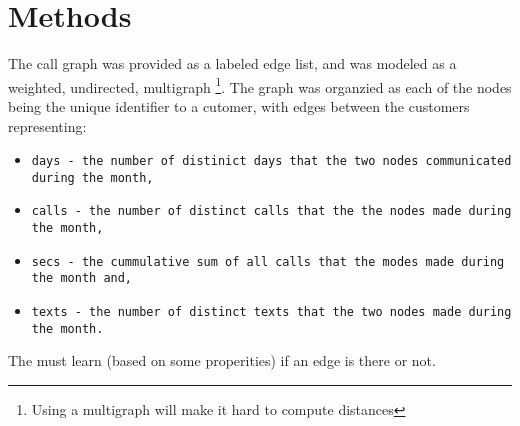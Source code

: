 \section{Methods}
The call graph was provided as a labeled edge list, and was modeled as a weighted, undirected, multigraph \footnote{Using a multigraph will make it hard to compute distances}.
The graph was organzied as each of the nodes being the unique identifier to a cutomer, with edges between the customers representing:
\begin{itemize}
	\item \tt{days} - the number of distinict days that the two nodes communicated during the month,
	\item \tt{calls} - the number of distinct calls that the the nodes made during the month,
	\item \tt{secs} - the cummulative sum of all calls that the modes made during the month and,
	\item \tt{texts} - the number of distinct texts that the two nodes made during the month.
\end{itemize}


The must learn (based on some properities) if an edge is there or not.

